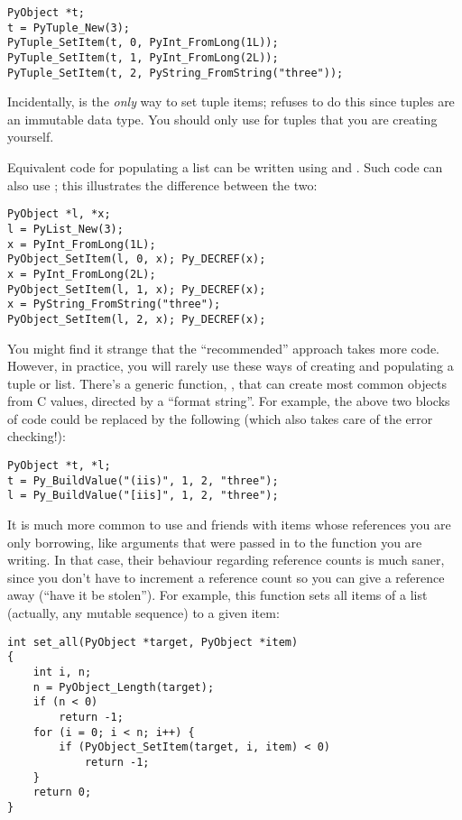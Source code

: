 \begin{verbatim}
PyObject *t;
t = PyTuple_New(3);
PyTuple_SetItem(t, 0, PyInt_FromLong(1L));
PyTuple_SetItem(t, 1, PyInt_FromLong(2L));
PyTuple_SetItem(t, 2, PyString_FromString("three"));
\end{verbatim}

Incidentally,  is the \emph{only} way to set 
tuple items;  refuses to do this since tuples 
are an immutable data type.  You should only use 
 for tuples that you are creating yourself.

Equivalent code for populating a list can be written using 
 and .  Such code can also 
use ; this illustrates the difference 
between the two:

\begin{verbatim}
PyObject *l, *x;
l = PyList_New(3);
x = PyInt_FromLong(1L);
PyObject_SetItem(l, 0, x); Py_DECREF(x);
x = PyInt_FromLong(2L);
PyObject_SetItem(l, 1, x); Py_DECREF(x);
x = PyString_FromString("three");
PyObject_SetItem(l, 2, x); Py_DECREF(x);
\end{verbatim}

You might find it strange that the ``recommended'' approach takes more
code.  However, in practice, you will rarely use these ways of
creating and populating a tuple or list.  There's a generic function,
, that can create most common objects from C 
values, directed by a ``format string''.  For example, the above two 
blocks of code could be replaced by the following (which also takes 
care of the error checking!):

\begin{verbatim}
PyObject *t, *l;
t = Py_BuildValue("(iis)", 1, 2, "three");
l = Py_BuildValue("[iis]", 1, 2, "three");
\end{verbatim}

It is much more common to use  and friends 
with items whose references you are only borrowing, like arguments 
that were passed in to the function you are writing.  In that case, 
their behaviour regarding reference counts is much saner, since you 
don't have to increment a reference count so you can give a reference 
away (``have it be stolen'').  For example, this function sets all 
items of a list (actually, any mutable sequence) to a given item:

\begin{verbatim}
int set_all(PyObject *target, PyObject *item)
{
    int i, n;
    n = PyObject_Length(target);
    if (n < 0)
        return -1;
    for (i = 0; i < n; i++) {
        if (PyObject_SetItem(target, i, item) < 0)
            return -1;
    }
    return 0;
}
\end{verbatim}

